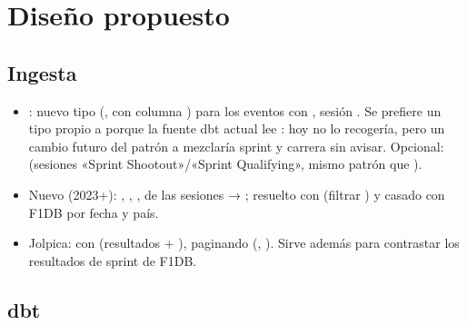 \section{Diseño propuesto}

\subsection{Ingesta}

\begin{itemize}
\item {}: nuevo tipo  (, con columna ) para los eventos con , sesión . Se prefiere un tipo propio a  porque la fuente dbt actual lee : hoy no lo recogería, pero un cambio futuro del patrón a \code{**} mezclaría sprint y carrera sin avisar. Opcional:  (sesiones «Sprint Shootout»/«Sprint Qualifying», mismo patrón que ).
\item Nuevo  (2023+): , , ,  de las sesiones  → ;  resuelto con  (filtrar ) y casado con F1DB por fecha y país.
\item Jolpica:  con  (resultados + ), paginando (, ). Sirve además para contrastar los resultados de sprint de F1DB.
\end{itemize}

\subsection{dbt}

